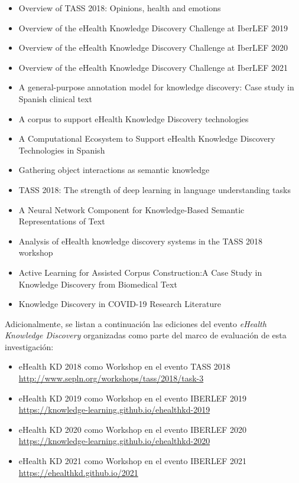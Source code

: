 \begin{itemize}
    \item Overview of TASS 2018: Opinions, health and emotions~\cite{tamartinez2018overview}
    \item Overview of the eHealth Knowledge Discovery Challenge at IberLEF 2019~\cite{tapiad2019overview}
    \item Overview of the eHealth Knowledge Discovery Challenge at IberLEF 2020~\cite{piad2020overview}
    \item Overview of the eHealth Knowledge Discovery Challenge at IberLEF 2021~\cite{piad2021overview}
    \item A general-purpose annotation model for knowledge discovery: Case study in Spanish clinical text~\cite{tapiad2019general}
    \item A corpus to support eHealth Knowledge Discovery technologies~\cite{piad2019corpus}
    \item A Computational Ecosystem to Support eHealth Knowledge Discovery Technologies in Spanish~\cite{piad2020computational}
    \item Gathering object interactions as semantic knowledge~\cite{taestevez2018gathering}
    \item TASS 2018: The strength of deep learning in language understanding tasks~\cite{tass}
    \item A Neural Network Component for Knowledge-Based Semantic Representations of Text~\cite{tapiad2019neural}
    \item Analysis of eHealth knowledge discovery systems in the TASS 2018 workshop~\cite{taalejandro2019analysis}
    \item Active Learning for Assisted Corpus Construction:A Case Study in Knowledge Discovery from Biomedical Text~\cite{canizares2021active}
    \item Knowledge Discovery in COVID-19 Research Literature~\cite{estevanell2021knowledge}
\end{itemize}

Adicionalmente, se listan a continuación las ediciones del evento \textit{eHealth Knowledge Discovery} organizadas como parte del marco de evaluación de esta investigación:

\begin{itemize}
    \item eHealth KD 2018 como Workshop en el evento TASS 2018\\ \url{http://www.sepln.org/workshops/tass/2018/task-3}
    \item eHealth KD 2019 como Workshop en el evento IBERLEF 2019\\ \url{https://knowledge-learning.github.io/ehealthkd-2019}
    \item eHealth KD 2020 como Workshop en el evento IBERLEF 2020\\ \url{https://knowledge-learning.github.io/ehealthkd-2020}
    \item eHealth KD 2021 como Workshop en el evento IBERLEF 2021\\ \url{https://ehealthkd.github.io/2021}
\end{itemize}
